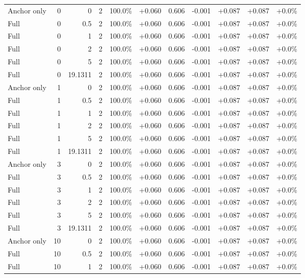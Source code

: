 \begin{table}[htbp]
\begin{tabular}{lrrrccccccc}
Anchor only & 0 & 0 & 2 & 100.0\% & +0.060 & 0.606 & -0.001 & +0.087 & +0.087 & +0.0\% \\
Full & 0 & 0.5 & 2 & 100.0\% & +0.060 & 0.606 & -0.001 & +0.087 & +0.087 & +0.0\% \\
Full & 0 & 1 & 2 & 100.0\% & +0.060 & 0.606 & -0.001 & +0.087 & +0.087 & +0.0\% \\
Full & 0 & 2 & 2 & 100.0\% & +0.060 & 0.606 & -0.001 & +0.087 & +0.087 & +0.0\% \\
Full & 0 & 5 & 2 & 100.0\% & +0.060 & 0.606 & -0.001 & +0.087 & +0.087 & +0.0\% \\
Full & 0 & 19.1311 & 2 & 100.0\% & +0.060 & 0.606 & -0.001 & +0.087 & +0.087 & +0.0\% \\
Anchor only & 1 & 0 & 2 & 100.0\% & +0.060 & 0.606 & -0.001 & +0.087 & +0.087 & +0.0\% \\
Full & 1 & 0.5 & 2 & 100.0\% & +0.060 & 0.606 & -0.001 & +0.087 & +0.087 & +0.0\% \\
Full & 1 & 1 & 2 & 100.0\% & +0.060 & 0.606 & -0.001 & +0.087 & +0.087 & +0.0\% \\
Full & 1 & 2 & 2 & 100.0\% & +0.060 & 0.606 & -0.001 & +0.087 & +0.087 & +0.0\% \\
Full & 1 & 5 & 2 & 100.0\% & +0.060 & 0.606 & -0.001 & +0.087 & +0.087 & +0.0\% \\
Full & 1 & 19.1311 & 2 & 100.0\% & +0.060 & 0.606 & -0.001 & +0.087 & +0.087 & +0.0\% \\
Anchor only & 3 & 0 & 2 & 100.0\% & +0.060 & 0.606 & -0.001 & +0.087 & +0.087 & +0.0\% \\
Full & 3 & 0.5 & 2 & 100.0\% & +0.060 & 0.606 & -0.001 & +0.087 & +0.087 & +0.0\% \\
Full & 3 & 1 & 2 & 100.0\% & +0.060 & 0.606 & -0.001 & +0.087 & +0.087 & +0.0\% \\
Full & 3 & 2 & 2 & 100.0\% & +0.060 & 0.606 & -0.001 & +0.087 & +0.087 & +0.0\% \\
Full & 3 & 5 & 2 & 100.0\% & +0.060 & 0.606 & -0.001 & +0.087 & +0.087 & +0.0\% \\
Full & 3 & 19.1311 & 2 & 100.0\% & +0.060 & 0.606 & -0.001 & +0.087 & +0.087 & +0.0\% \\
Anchor only & 10 & 0 & 2 & 100.0\% & +0.060 & 0.606 & -0.001 & +0.087 & +0.087 & +0.0\% \\
Full & 10 & 0.5 & 2 & 100.0\% & +0.060 & 0.606 & -0.001 & +0.087 & +0.087 & +0.0\% \\
Full & 10 & 1 & 2 & 100.0\% & +0.060 & 0.606 & -0.001 & +0.087 & +0.087 & +0.0\% \\

\end{tabular}
\end{table}

